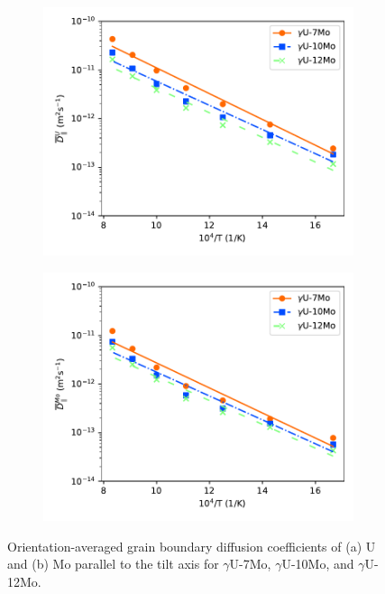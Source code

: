 \documentclass{elsarticle}
\begin{document}
\begin{figure}[!ht]
\begin{subfigure}{0.49\textwidth}
	\centering
	\caption{}
	\includegraphics[width=\textwidth]{comp_U_Dz.pdf}
\end{subfigure}
\begin{subfigure}{0.49\textwidth}
	\centering
	\caption{}
	\includegraphics[width=\textwidth]{comp_Mo_Dz.pdf}
\end{subfigure}
\caption{Orientation-averaged grain boundary diffusion coefficients of (a) U and (b) Mo parallel to the tilt axis for $\gamma$U-7Mo, $\gamma$U-10Mo, and $\gamma$U-12Mo.}
\label{fig:comp}
\end{figure}
\end{document}
